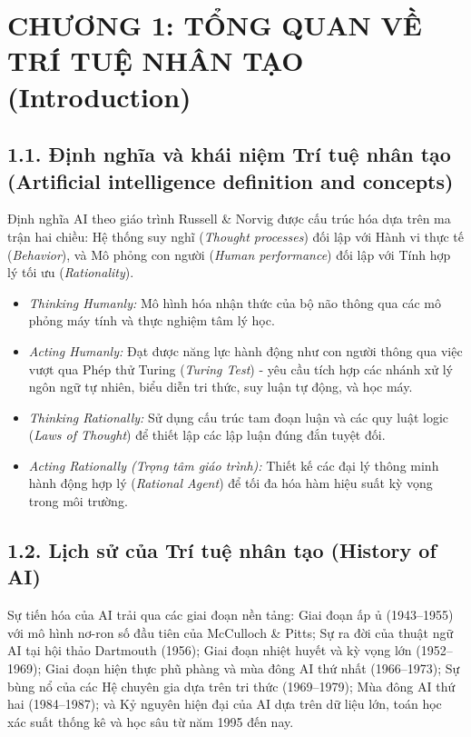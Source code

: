 \documentclass[../main.tex]{subfiles}
\begin{document}

\section{CHƯƠNG 1: TỔNG QUAN VỀ TRÍ TUỆ NHÂN TẠO (Introduction)}
\subsection{1.1. Định nghĩa và khái niệm Trí tuệ nhân tạo (Artificial intelligence definition and concepts)}
Định nghĩa AI theo giáo trình Russell \& Norvig được cấu trúc hóa dựa trên ma trận hai chiều: Hệ thống suy nghĩ (\textit{Thought processes}) đối lập với Hành vi thực tế (\textit{Behavior}), và Mô phỏng con người (\textit{Human performance}) đối lập với Tính hợp lý tối ưu (\textit{Rationality}).
\begin{itemize}
    \item \textit{Thinking Humanly:} Mô hình hóa nhận thức của bộ não thông qua các mô phỏng máy tính và thực nghiệm tâm lý học.
    \item \textit{Acting Humanly:} Đạt được năng lực hành động như con người thông qua việc vượt qua Phép thử Turing (\textit{Turing Test}) - yêu cầu tích hợp các nhánh xử lý ngôn ngữ tự nhiên, biểu diễn tri thức, suy luận tự động, và học máy.
    \item \textit{Thinking Rationally:} Sử dụng cấu trúc tam đoạn luận và các quy luật logic (\textit{Laws of Thought}) để thiết lập các lập luận đúng đắn tuyệt đối.
    \item \textit{Acting Rationally (Trọng tâm giáo trình):} Thiết kế các đại lý thông minh hành động hợp lý (\textit{Rational Agent}) để tối đa hóa hàm hiệu suất kỳ vọng trong môi trường.
\end{itemize}

\subsection{1.2. Lịch sử của Trí tuệ nhân tạo (History of AI)}
Sự tiến hóa của AI trải qua các giai đoạn nền tảng: Giai đoạn ấp ủ (1943--1955) với mô hình nơ-ron số đầu tiên của McCulloch \& Pitts; Sự ra đời của thuật ngữ AI tại hội thảo Dartmouth (1956); Giai đoạn nhiệt huyết và kỳ vọng lớn (1952--1969); Giai đoạn hiện thực phũ phàng và mùa đông AI thứ nhất (1966--1973); Sự bùng nổ của các Hệ chuyên gia dựa trên tri thức (1969--1979); Mùa đông AI thứ hai (1984--1987); và Kỷ nguyên hiện đại của AI dựa trên dữ liệu lớn, toán học xác suất thống kê và học sâu từ năm 1995 đến nay.
\end{document}
